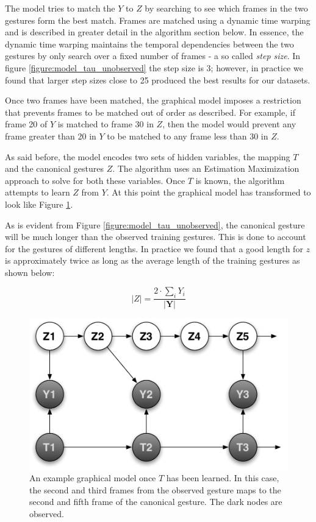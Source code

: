 \documentclass{article}
\begin{document}
The model tries to match the $Y$ to $Z$ by searching to see which frames in the
two gestures form the best match. Frames are matched using a dynamic time
warping and is described in greater detail in the algorithm section below. In
essence, the dynamic time warping maintains the temporal dependencies between
the two gestures by only search over a fixed number of frames - a so called
\emph{step size}. In figure \ref{figure:model_tau_unobserved} the step size is
3; however, in practice we found that larger step sizes close to 25 produced the
best results for our datasets.

Once two frames have been matched, the graphical model imposes a restriction
that prevents frames to be matched out of order as described. For example, if
frame 20 of $Y$ is matched to frame 30 in $Z$, then the model would prevent any
frame greater than 20 in $Y$ to be matched to any frame less than 30 in $Z$.

As said before, the model encodes two sets of hidden variables, the mapping
$T$ and the canonical gestures $Z$. The algorithm uses an Estimation
Maximization approach to solve for both these variables. Once $T$ is known,
the algorithm attempts to learn $Z$ from $Y$. At this point the graphical
model has transformed to look like Figure \ref{figure:model_tau_observed}.

As is evident from Figure \ref{figure:model_tau_unobserved}, the canonical
gesture will be much longer than the observed training gestures. This is done to
account for the gestures of different lengths. In practice we found that a good
length for $z$ is approximately twice as long as the average length of the
training gestures as shown below:

\[
	|Z| = \frac{2 \cdot \sum_{i}{Y_i}}{|\mathbf{Y}|}
\]

\begin{figure}
\begin{centering}
\includegraphics[width=0.63\columnwidth]{figures/model_tau_observed.pdf}

\caption{An example graphical model once $T$ has been learned. In this case,
the second and third frames from the observed gesture maps to the second and
fifth frame of the canonical gesture. The dark nodes are observed.
\label{figure:model_tau_observed}}

\end{centering}
\end{figure}
\end{document}
